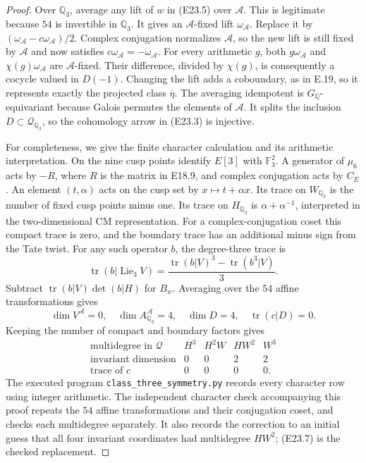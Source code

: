 \documentclass[11pt,oneside]{article}
\begin{document}
\begin{proof}
Over $\mathbb Q_3$, average any lift of $w$ in (E23.5)
over $\mathcal A$. This is legitimate because $54$ is
invertible in $\mathbb Q_3$. It gives an
$\mathcal A$-fixed lift $\omega_{\mathcal A}$.
Replace it by
$(\omega_{\mathcal A}-c\omega_{\mathcal A})/2$.
Complex conjugation normalizes $\mathcal A$, so the
new lift is still fixed by $\mathcal A$ and now satisfies
$c\omega_{\mathcal A}=-\omega_{\mathcal A}$.
For every arithmetic $g$, both $g\omega_{\mathcal A}$
and $\chi(g)\omega_{\mathcal A}$ are
$\mathcal A$-fixed. Their difference, divided by $\chi(g)$,
is consequently a cocycle valued in $D(-1)$.
Changing the lift adds a coboundary, as in E.19, so it
represents exactly the projected class $\overline\eta$.
The averaging idempotent is $G_{\mathbb Q}$-equivariant
because Galois permutes the elements of $\mathcal A$.
It splits the inclusion $D\subset\mathcal Q_{\mathbb Q_3}$,
so the cohomology arrow in (E23.3) is injective.

For completeness, we give the finite character calculation
and its arithmetic interpretation. On the nine cusp points
identify $E[3]$ with $\mathbb F_3^2$. A generator of
$\mu_6$ acts by $-R$, where $R$ is the matrix in E18.9,
and complex conjugation acts by $C_E$. An element
$(t,\alpha)$ acts on the cusp set by $x\mapsto t+\alpha x$.
Its trace on $W_{\mathbb Q_3}$ is the number of fixed
cusp points minus one. Its trace on $H_{\mathbb Q_3}$
is $\alpha+\alpha^{-1}$, interpreted in the two-dimensional
CM representation. For a complex-conjugation coset this
compact trace is zero, and the boundary trace has an
additional minus sign from the Tate twist.
For any such operator $b$, the degree-three trace is
\[
 \operatorname{tr}(b|\operatorname{Lie}_3V)
 =\frac{\operatorname{tr}(b|V)^3-
                    \operatorname{tr}(b^3|V)}{3}.
 \tag{E23.6}
\]
Subtract $\operatorname{tr}(b|V)\det(b|H)$ for $B_w$.
Averaging over the $54$ affine transformations gives
\[
 \dim V^{\mathcal A}=0,\quad
 \dim A_{\mathbb Q_3}^{\mathcal A}=4,\quad
 \dim D=4,\quad \operatorname{tr}(c|D)=0.
\]
Keeping the number of compact and boundary factors gives
\[
\begin{array}{c|rrrr}
 \text{multidegree in }\mathcal Q&H^3&H^2W&HW^2&W^3\\\hline
 \text{invariant dimension}&0&0&2&2\\
 \text{trace of }c&0&0&0&0 .
\end{array}
 \tag{E23.7}
\]
The executed program \texttt{class\_three\_symmetry.py}
records every character row using integer arithmetic.
The independent character check accompanying this proof
repeats the $54$ affine transformations and their conjugation
coset, and checks each multidegree separately. It also records
the correction to an initial guess that all four invariant
coordinates had multidegree $HW^2$; (E23.7) is the checked
replacement.


\end{proof}
\end{document}

